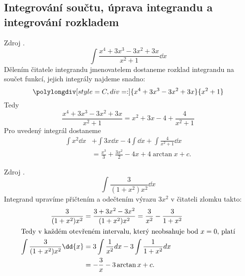     \subsection{Integrování součtu, úprava integrandu a integrování rozkladem}
      \begin{example}
        Zdroj \cite[s.~29]{Knichal}.
        \begin{equation}\label{MA:int_ex_01}
          \int{\frac{x^4+3x^3-3x^2+3x}{x^2+1}\dd{x}}
        \end{equation}
        Dělením čitatele integrandu jmenovatelem  dostaneme rozklad integrandu na součet funkcí,
        jejich integrály najdeme snadno:
         \begin{equation*} 
           \polylongdiv[style=C,div=:]{x^4+3x^3-3x^2+3x}{x^2+1}
         \end{equation*}
         Tedy
         \begin{equation*}
           \frac{x^4+3x^3-3x^2+3x}{x^2+1} = x^2+3x-4+\frac{4}{x^2+1}  
         \end{equation*}
         Pro uvedený integrál dostaneme
         \begin{align*}
           \int{x^2}\dd{x} &+\int{3x}\dd{x}-4\int\dd{x}+\int{\frac{4}{x^2+1}\dd{x}} \\
                           &= \frac{x^3}{3}+\frac{3x^2}{2}-4x+4\arctan x + c.
         \end{align*}
      \end{example}
      
      \begin{example}
        Zdroj \cite[s.~29]{Knichal}.
        \begin{equation}\label{MA:int_ex_02}
          \int\frac{3}{(1+x^2)x^2}\dd{x}
        \end{equation}
        Integrand upravíme přičtením a odečtením výrazu $3x^2$ v čitateli zlomku takto:
        \begin{align*}
          \frac{3}{(1+x^2)x^2} 
            &= \frac{3+3x^2-3x^2}{(1+x^2)x^2} = \frac{3}{x^2}-\frac{3}{1+x^2}                      \\  
          \intertext{Tedy v každém otevřeném intervalu, který neobsahuje bod \(x=0\), platí}
          \int{\frac{3}{(1+x^2)x^2}\dd{x}} 
            &= 3\int{\frac{1}{x^2}dx} - 3\int{\frac{1}{1+x^2}dx}                                   \\
            &= -\frac{3}{x}-3\arctan x + c. 
        \end{align*}
      \end{example}
      
